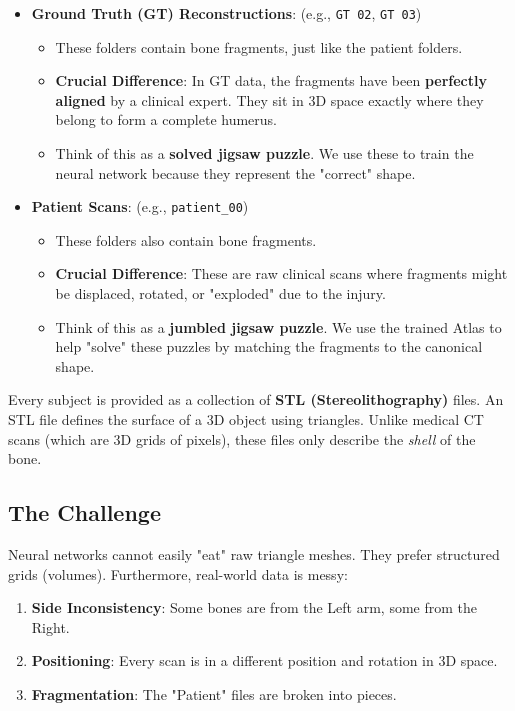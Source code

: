 \documentclass[12pt]{article}
\begin{document}
\begin{itemize}
    \item \textbf{Ground Truth (GT) Reconstructions}: (e.g., \texttt{GT 02}, \texttt{GT 03})
    \begin{itemize}
        \item These folders contain bone fragments, just like the patient folders.
        \item \textbf{Crucial Difference}: In GT data, the fragments have been \textbf{perfectly aligned} by a clinical expert. They sit in 3D space exactly where they belong to form a complete humerus.
        \item Think of this as a \textbf{solved jigsaw puzzle}. We use these to train the neural network because they represent the "correct" shape.
    \end{itemize}
    
    \item \textbf{Patient Scans}: (e.g., \texttt{patient\_00})
    \begin{itemize}
        \item These folders also contain bone fragments.
        \item \textbf{Crucial Difference}: These are raw clinical scans where fragments might be displaced, rotated, or "exploded" due to the injury.
        \item Think of this as a \textbf{jumbled jigsaw puzzle}. We use the trained Atlas to help "solve" these puzzles by matching the fragments to the canonical shape.
    \end{itemize}
\end{itemize}

Every subject is provided as a collection of \textbf{STL (Stereolithography)} files. An STL file defines the surface of a 3D object using triangles. Unlike medical CT scans (which are 3D grids of pixels), these files only describe the \textit{shell} of the bone.

\subsection{The Challenge}
Neural networks cannot easily "eat" raw triangle meshes. They prefer structured grids (volumes). Furthermore, real-world data is messy:
\begin{enumerate}
    \item \textbf{Side Inconsistency}: Some bones are from the Left arm, some from the Right.
    \item \textbf{Positioning}: Every scan is in a different position and rotation in 3D space.
    \item \textbf{Fragmentation}: The "Patient" files are broken into pieces.
\end{enumerate}
\end{document}
